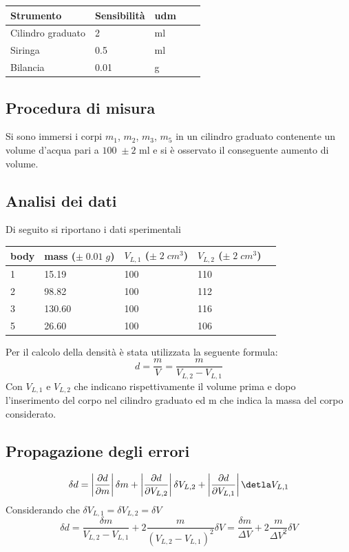 \documentclass[11pt,a4paper]{article}
\begin{document}
\begin{longtable}[]{@{}lllll@{}}
\toprule
Strumento & Sensibilità & udm \tabularnewline
\midrule
\endhead
Cilindro graduato & 2 & ml \tabularnewline
Siringa & 0.5 & ml \tabularnewline
Bilancia & 0.01 & g \tabularnewline
\bottomrule
\end{longtable}

\subsection{Procedura di misura}
Si sono immersi i corpi $m_1$, $m_2$, $m_3$, $m_5$ in un cilindro graduato contenente un volume d'acqua pari a $100 \; \pm 2$ ml e si è osservato il conseguente aumento di volume.

\subsection{Analisi dei dati}
Di seguito si riportano i dati sperimentali

\begin{longtable}[]{@{}lllll@{}}
\toprule
body & mass ($\pm \; 0.01 \; g$) & $V_{L,1}$ ($\pm \; 2 \; cm^3$) & $V_{L,2}$ ($\pm \; 2 \; cm^3$) \tabularnewline
\midrule
\endhead
1 & 15.19 & 100 & 110 \tabularnewline
2 & 98.82 & 100 & 112 \tabularnewline
3 & 130.60 & 100 & 116 \tabularnewline
5 & 26.60 & 100 & 106 \tabularnewline
\bottomrule
\end{longtable}

Per il calcolo della densità è stata utilizzata la seguente formula:
\begin{equation}
    d=\frac{m}{V}=\frac{m}{V_{L,2}-V_{L,1}}
\end{equation}
Con $V_{L,1}$ e $V_{L,2}$ che indicano rispettivamente il volume prima e dopo l'inserimento del corpo nel cilindro graduato ed m che indica la massa del corpo considerato.

\subsection{Propagazione degli errori}
\begin{equation}
    \delta d=\left|\frac{\partial d}{\partial m} \right|\delta m + \left |\frac{\partial d}{\partial V_{L,2}} \right| \delta V_{L,2} + \left |\frac{\partial d}{\partial V_{L,1}} \right| \detla V_{L,1}
\end{equation}
Considerando che $\delta V_{L,1}=\delta V_{L,2}=\delta V$
\begin{equation}
    \delta d = \frac{\delta m}{V_{L,2} - V_{L,1}} + 2\frac{m}{(V_{L,2} - V_{L,1})^2}\delta V = \frac{\delta m}{\Delta V} + 2\frac{m}{\Delta V^2}\delta V
\end{equation}
\end{document}
